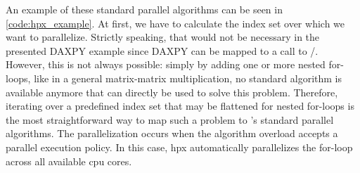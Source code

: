 An example of these  standard parallel algorithms can be seen in \autoref{code:hpx_example}. 
At first, we have to calculate the index set over which we want to parallelize. 
Strictly speaking, that would not be necessary in the presented DAXPY example since DAXPY can be mapped to a call to /. 
However, this is not always possible: simply by adding one or more nested for-loops, like in a general matrix-matrix multiplication, no \cpp standard algorithm is available anymore that can directly be used to solve this problem. 
Therefore, iterating over a predefined index set that may be flattened for nested for-loops is the most straightforward way to map such a problem to \cpp's standard parallel algorithms. 
The parallelization occurs when the  algorithm overload accepts a parallel execution policy.  
In this case, \gls{hpx} automatically parallelizes the for-loop across all available \gls{cpu} cores. 


